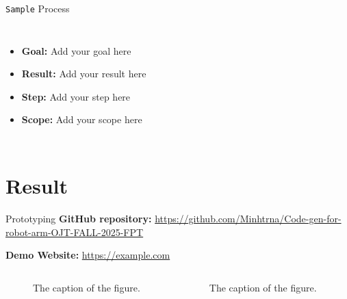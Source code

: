 \documentclass{beamer}
\begin{document}
\begin{frame}[label=process1]{\texttt{Sample} Process \hyperlink{algo1}{} \hyperlink{pseudocode1}{}}
    \begin{columns}
        \centering
        \begin{itemize}
            \item \textbf{Goal:} Add your goal here
            \item \textbf{Result:} Add your result here
            \item \textbf{Step:} Add your step here
            \item \textbf{Scope:} Add your scope here
        \end{itemize}
    \end{columns}
    \note{}
\end{frame}
                                
\section{Result} 
            
\begin{frame}{Prototyping}
    \textbf{GitHub repository:} \url{https://github.com/Minhtrna/Code-gen-for-robot-arm-OJT-FALL-2025-FPT}
                                                                
    \textbf{Demo Website:} \url{https://example.com}
                            
    \begin{columns}
        \begin{figure}
            \centering
            \caption{The caption of the figure.}
        \end{figure}	
        \begin{figure}
            \centering
            \caption{The caption of the figure.}
        \end{figure}
    \end{columns}
    \note{}
\end{frame}
            
\end{document}

